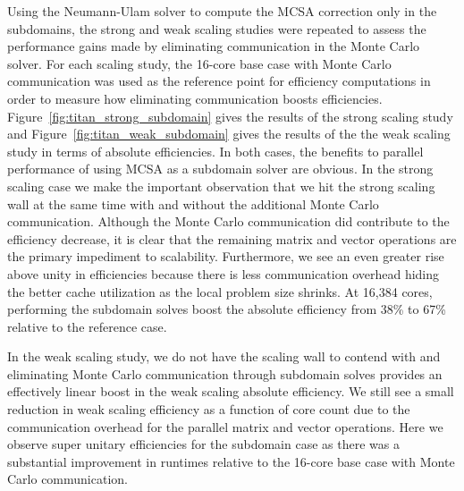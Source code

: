 Using the Neumann-Ulam solver to compute the MCSA correction only in
the subdomains, the strong and weak scaling studies were repeated to
assess the performance gains made by eliminating communication in the
Monte Carlo solver. For each scaling study, the 16-core base case with
Monte Carlo communication was used as the reference point for
efficiency computations in order to measure how eliminating
communication boosts
efficiencies. Figure~\ref{fig:titan_strong_subdomain} gives the
results of the strong scaling study and
Figure~\ref{fig:titan_weak_subdomain} gives the results of the the
weak scaling study in terms of absolute efficiencies. In both cases,
the benefits to parallel performance of using MCSA as a subdomain
solver are obvious. In the strong scaling case we make the important
observation that we hit the strong scaling wall at the same time with
and without the additional Monte Carlo communication. Although the
Monte Carlo communication did contribute to the efficiency decrease,
it is clear that the remaining matrix and vector operations are the
primary impediment to scalability. Furthermore, we see an even greater
rise above unity in efficiencies because there is less communication
overhead hiding the better cache utilization as the local problem size
shrinks. At 16,384 cores, performing the subdomain solves boost the
absolute efficiency from 38\% to 67\% relative to the reference case.

In the weak scaling study, we do not have the scaling wall to contend
with and eliminating Monte Carlo communication through subdomain
solves provides an effectively linear boost in the weak scaling
absolute efficiency. We still see a small reduction in weak scaling
efficiency as a function of core count due to the communication
overhead for the parallel matrix and vector operations. Here we
observe super unitary efficiencies for the subdomain case as there was
a substantial improvement in runtimes relative to the 16-core base
case with Monte Carlo communication.

